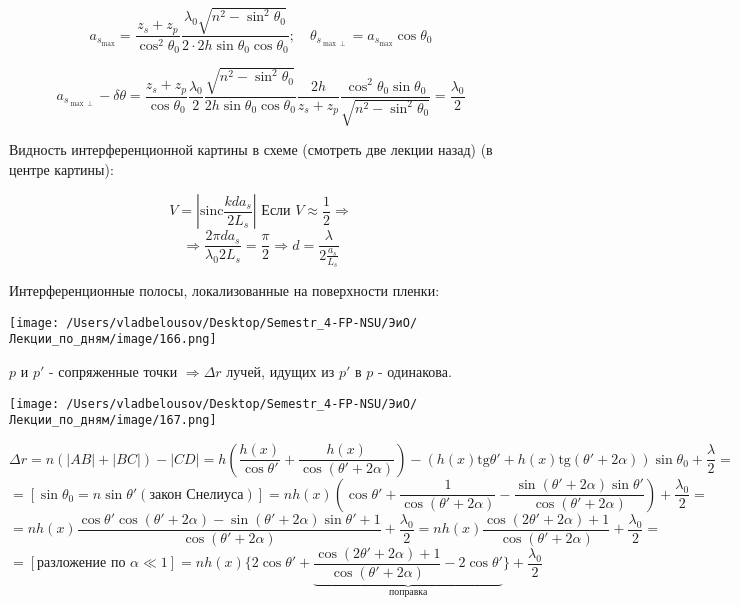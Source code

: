 \documentclass[12pt, a4paper]{report}
\begin{document}
\[ a_{s _{\max  } } = \frac{ z_s + z_p }{\cos  ^2 \theta_0 } \frac{ \lambda_0 \sqrt{ n ^2 - \sin ^2 \theta_0 } }{2 \cdot 2 h \sin  \theta_0 \cos  \theta_0 } ; \quad  \theta_{s _{\max  \perp } } = a_{s _{ \max  } } \cos  \theta_0       \] 

\[ a_{s _{ \max  \perp } }  - \delta \theta = \frac{ z_s + z_p }{ \cos  \theta_0 } \frac{\lambda_0}{2 }  \frac{\sqrt{ n ^2 - \sin  ^2 \theta_0 } }{2 h \sin  \theta_0 \cos  \theta_0 } \frac{ 2 h }{z_s + z_p } \frac{ \cos  ^2 \theta_0 \sin  \theta_0 }{\sqrt{n ^2 - \sin  ^2 \theta_0 } }= \frac{\lambda_0}{2}       \] 

Видность интерференционной картины в схеме (смотреть две лекции назад) (в центре картины): 

\[ V = \left\lvert \mathrm{ sinc } \frac{k d a_s }{ 2 L_s }    \right\rvert \text{ Если } V \approx \frac{1}{2  } \Rightarrow    \] 
\[ \Rightarrow \frac{ 2 \pi d a_s }{\lambda_0 2 L_s } = \frac{\pi}{2 }  \Rightarrow d = \frac{\lambda}{\displaystyle  2 \frac{a_s}{L_s} }   \] 

Интерференционные полосы, локализованные на поверхности пленки:

\begin{center}
    \texttt{[image: /Users/vladbelousov/Desktop/Semestr\_4-FP-NSU/ЭиО/Лекции\_по\_дням/image/166.png]}
\end{center}
\( p \) и \( p' \) - сопряженные точки \( \Rightarrow  \Delta r \) лучей, идущих из \( p ' \) в \(  p \)  - одинакова.

\begin{center}
    \texttt{[image: /Users/vladbelousov/Desktop/Semestr\_4-FP-NSU/ЭиО/Лекции\_по\_дням/image/167.png]}
\end{center}
\[ \Delta r = n (\left\lvert  AB  \right\rvert + \left\lvert BC \right\rvert) - \left\lvert   CD\right\rvert  = h \left( \frac{h (x )}{ \cos  \theta '} + \frac{ h (x )}{\cos (\theta ' + 2 \alpha ) }    \right) - (h (x ) \mathrm{ tg }  \theta ' + h(x ) \mathrm{tg }  ( \theta ' + 2 \alpha )  ) \sin \theta_0 + \frac{\lambda}{2 } = \] 
\[ = \left[ \sin  \theta_0 = n \sin \theta ' (\text{закон Снелиуса} ) \right] = n h (x ) \left(  \cos  \theta ' + \frac{1}{ \cos  (\theta ' + 2 \alpha )} - \frac{ \sin (\theta '  + 2 \alpha ) \sin  \theta ' }{ \cos  (\theta ' + 2\alpha)}   \right) + \frac{\lambda_0}{2} = \] 
\[ =n h(x ) \frac{ \cos  \theta ' \cos  ( \theta ' + 2 \alpha ) - \sin  ( \theta ' + 2 \alpha ) \sin  \theta ' + 1 }{ \cos ( \theta ' + 2\alpha)}  + \frac{\lambda_0}{2 } =  n h(x ) \frac{ \cos  (2 \theta ' + 2 \alpha ) + 1 } {\cos  ( \theta ' + 2\alpha )}     + \frac{\lambda_0}{2 }   =  \]  
\[ = \left[ \text{разложение по } \alpha \ll 1 \right] = n h(x ) \bigg\{ 2 \cos  \theta ' + \underbrace{\frac{ \cos ( 2 \theta ' + 2 \alpha )+1}{\cos  (\theta ' + 2 \alpha )} - 2 \cos  \theta'}_{\text{поправка} } \bigg\} + \frac{\lambda_0}{2}  \] 
\end{document}

